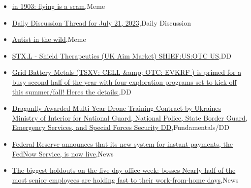 \documentclass{article}%
\begin{document}
%
\begin{itemize}%
\item%
\href{https://reddit.com/r/wallstreetbets/comments/155kbh0/in\_1903\_flying\_is\_a\_scam/}{ in 1903: flying is a scam},Meme%
\item%
\href{https://reddit.com/r/wallstreetbets/comments/155jje8/daily\_discussion\_thread\_for\_july\_21\_2023/}{Daily Discussion Thread for July 21, 2023},Daily Discussion%
\item%
\href{https://reddit.com/r/wallstreetbets/comments/155j1t2/autist\_in\_the\_wild/}{Autist in the wild},Meme%
\item%
\href{https://reddit.com/r/wallstreetbets/comments/155hn54/stxl\_shield\_therapeutics\_uk\_aim\_market\_shiefusotc/}{STX.L - Shield Therapeutics (UK Aim Market) SHIEF:US:OTC US},DD%
\item%
\href{https://reddit.com/r/Baystreetbets/comments/1553qlr/grid\_battery\_metals\_tsxv\_cell\_otc\_evkrf\_is\_primed/}{Grid Battery Metals (TSXV: CELL \&amp; OTC: EVKRF ) is primed for a busy second half of the year with four exploration programs set to kick off this summer/fall! Heres the details:},DD%
\item%
\href{https://reddit.com/r/StockMarket/comments/155izzq/draganfly\_awarded\_multiyear\_drone\_training/}{Draganfly Awarded Multi-Year Drone Training Contract by Ukraines Ministry of Interior for National Guard, National Police, State Border Guard, Emergency Services, and Special Forces Security DD},Fundamentals/DD%
\item%
\href{https://reddit.com/r/Economics/comments/1556bt3/federal\_reserve\_announces\_that\_its\_new\_system\_for/}{Federal Reserve announces that its new system for instant payments, the FedNow Service, is now live},News%
\item%
\href{https://reddit.com/r/Economics/comments/1553tq0/the\_biggest\_holdouts\_on\_the\_fiveday\_office\_week/}{The biggest holdouts on the five-day office week: bosses  Nearly half of the most senior employees are holding fast to their work-from-home days},News%
\end{itemize}%
\end{document}
